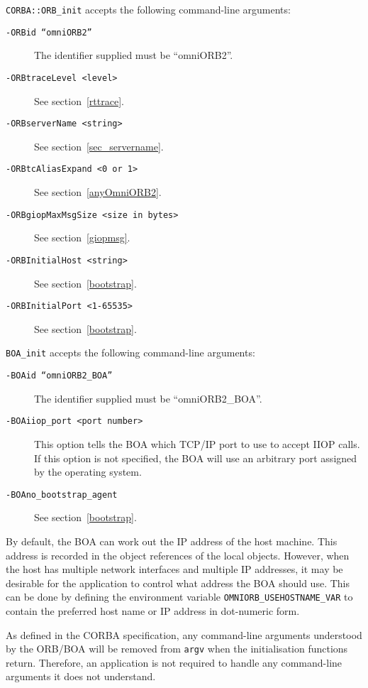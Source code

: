 \documentclass[11pt,twoside,onecolumn]{book}
\begin{document}
{\tt CORBA::ORB\_init} accepts the following command-line arguments:

\begin{description}

\item[\tt -ORBid ``omniORB2''] The identifier supplied must be ``omniORB2''.
\item[\tt -ORBtraceLevel <level>] See section~\ref{rttrace}.
\item[\tt -ORBserverName <string>] See section~\ref{sec_servername}.
\item[\tt -ORBtcAliasExpand <0 or 1>] See section~\ref{anyOmniORB2}.
\item[\tt -ORBgiopMaxMsgSize <size in bytes>] See section~\ref{giopmsg}.
\item[\tt -ORBInitialHost <string>] See section~\ref{bootstrap}.
\item[\tt -ORBInitialPort <1-65535>] See section~\ref{bootstrap}.
\end{description}

{\tt BOA\_init} accepts the following command-line arguments:

\begin{description}

\item[\tt -BOAid ``omniORB2\_BOA''] The identifier supplied must be ``omniORB2\_BOA''.
\item[\tt -BOAiiop\_port <port number>] This option tells the BOA which
TCP/IP port to use to accept IIOP calls. If this option is not specified,
the BOA will use an arbitrary port assigned by the operating system.
\item[\tt -BOAno\_bootstrap\_agent] See section~\ref{bootstrap}.
\end{description}

By default, the BOA can work out the IP address of the host machine. This
address is recorded in the object references of the local objects.
However, when the host has multiple network interfaces and multiple IP
addresses, it may be desirable for the application to control what address
the BOA should use. This can be done by defining the environment variable
{\tt OMNIORB\_USEHOSTNAME\_VAR} to contain the preferred host name or IP
address in dot-numeric form.


As defined in the CORBA specification, any command-line arguments
understood by the ORB/BOA will be removed from {\tt argv} when the
initialisation functions return. Therefore, an application is not required
to handle any command-line arguments it does not understand.
\end{document}

